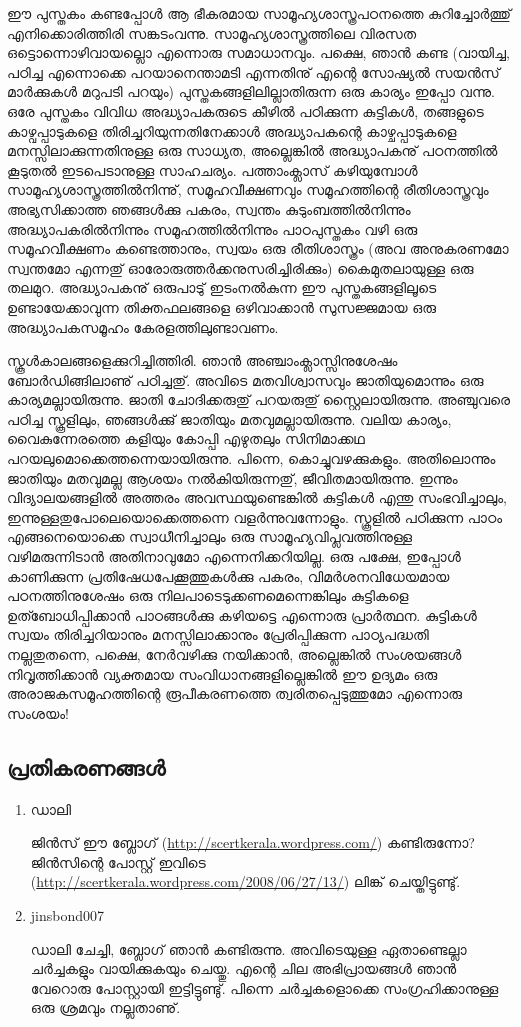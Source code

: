ഈ പുസ്തകം കണ്ടപ്പോള്‍ ആ ഭീകരമായ സാമൂഹ്യശാസ്ത്രപഠനത്തെ കുറിച്ചോര്‍ത്തു് എനിക്കൊരിത്തിരി സങ്കടംവന്നു. സാമൂഹ്യശാസ്ത്രത്തിലെ വിരസത ഒട്ടൊന്നൊഴിവായല്ലൊ എന്നൊരു സമാധാനവും. പക്ഷെ, ഞാന്‍ കണ്ട (വായിച്ച, പഠിച്ച എന്നൊക്കെ പറയാനെന്താമടി എന്നതിനു് എന്റെ സോഷ്യല്‍ സയന്‍സ് മാര്‍ക്കുകള്‍ മറുപടി പറയും) പുസ്തകങ്ങളിലില്ലാതിരുന്ന ഒരു കാര്യം ഇപ്പോ വന്നു. ഒരേ പുസ്തകം വിവിധ അദ്ധ്യാപകരുടെ കീഴില്‍ പഠിക്കുന്ന കുട്ടികള്‍, തങ്ങളുടെ കാഴ്വപ്പാടുകളെ തിരിച്ചറിയുന്നതിനേക്കാള്‍ അദ്ധ്യാപകന്റെ കാഴ്ചപ്പാടുകളെ മനസ്സിലാക്കുന്നതിനുള്ള ഒരു സാധ്യത, അല്ലെങ്കില്‍ അദ്ധ്യാപകനു് പഠനത്തില്‍ കൂടുതല്‍ ഇടപെടാനുള്ള സാഹചര്യം. പത്താംക്ലാസ് കഴിയുമ്പോള്‍ സാമൂഹ്യശാസ്ത്രത്തില്‍നിന്നു്, സമൂഹവീക്ഷണവും സമൂഹത്തിന്റെ രീതിശാസ്ത്രവും അഭ്യസിക്കാത്ത ഞങ്ങള്‍ക്കു പകരം, സ്വന്തം കുടുംബത്തില്‍നിന്നും അദ്ധ്യാപകരില്‍നിന്നും സമൂഹത്തില്‍നിന്നും പാഠപുസ്തകം വഴി ഒരു സമൂഹവീക്ഷണം കണ്ടെത്താനും, സ്വയം ഒരു രീതിശാസ്ത്രം (അവ അനുകരണമോ സ്വന്തമോ എന്നതു് 
ഓരോരുത്തര്‍ക്കനുസരിച്ചിരിക്കും) കൈമുതലായുള്ള ഒരു തലമുറ. അദ്ധ്യാപകനു് ഒരുപാടു് ഇടംനല്‍കുന്ന ഈ പുസ്തകങ്ങളിലൂടെ ഉണ്ടായേക്കാവുന്ന 
തിക്തഫലങ്ങളെ ഒഴിവാക്കാന്‍ സുസജ്ജമായ ഒരു അദ്ധ്യാപകസമൂഹം കേരളത്തിലുണ്ടാവണം.

സ്കൂള്‍കാലങ്ങളെക്കുറിച്ചിത്തിരി. ഞാന്‍ അഞ്ചാംക്ലാസ്സിനുശേഷം ബോര്‍ഡിങ്ങിലാണു് പഠിച്ചതു്. അവിടെ മതവിശ്വാസവും ജാതിയുമൊന്നും ഒരു കാര്യമല്ലായിരുന്നു. ജാതി ചോദിക്കരുതു് പറയരുതു് സ്റ്റൈലായിരുന്നു. അഞ്ചുവരെ പഠിച്ച സ്കൂളിലും, ഞങ്ങള്‍ക്കു് ജാതിയും മതവുമല്ലായിരുന്നു. വലിയ കാര്യം, വൈകുന്നേരത്തെ കളിയും കോപ്പി എഴുതലും സിനിമാക്കഥ പറയലുമൊക്കെത്തന്നെയായിരുന്നു. പിന്നെ, കൊച്ചുവഴക്കുകളും. അതിലൊന്നും ജാതിയും മതവുമല്ല ആശയം നല്‍കിയിരുന്നതു്, ജീവിതമായിരുന്നു. ഇന്നും വിദ്യാലയങ്ങളില്‍ അത്തരം അവസ്ഥയുണ്ടെങ്കില്‍ കുട്ടികള്‍ എന്തു സംഭവിച്ചാലും, ഇന്നുള്ളതുപോലെയൊക്കെത്തന്നെ വളര്‍ന്നുവന്നോളും. സ്കൂളില്‍ പഠിക്കുന്ന പാഠം എങ്ങനെയൊക്കെ സ്വാധീനിച്ചാലും ഒരു സാമൂഹ്യവിപ്ലവത്തിനുള്ള വഴിമരുന്നിടാന്‍ അതിനാവുമോ എന്നെനിക്കറിയില്ല. ഒരു പക്ഷേ, ഇപ്പോള്‍ കാണിക്കുന്ന 
പ്രതിഷേധപേക്കൂത്തുകള്‍ക്കു പകരം, വിമര്‍ശനവിധേയമായ പഠനത്തിനുശേഷം ഒരു നിലപാടെടുക്കണമെന്നെങ്കിലും കുട്ടികളെ ഉത്ബോധിപ്പിക്കാന്‍ പാഠങ്ങള്‍ക്കു കഴിയട്ടെ എന്നൊരു പ്രാര്‍ത്ഥന. കുട്ടികള്‍ സ്വയം തിരിച്ചറിയാനും മനസ്സിലാക്കാനും പ്രേരിപ്പിക്കുന്ന പാഠ്യപദ്ധതി നല്ലതുതന്നെ, പക്ഷെ, നേര്‍വഴിക്കു നയിക്കാന്‍, അല്ലെങ്കില്‍ സംശയങ്ങള്‍ നിവൃത്തിക്കാന്‍ വ്യക്തമായ സംവിധാനങ്ങളില്ലെങ്കില്‍ ഈ ഉദ്യമം ഒരു അരാജകസമൂഹത്തിന്റെ രൂപീകരണത്തെ ത്വരിതപ്പെടുത്തുമോ എന്നൊരു സംശയം!

\subsection*{പ്രതികരണങ്ങള്‍}

\begin{enumerate}
 \item{ഡാലി}

ജിന്‍സ് ഈ ബ്ലോഗ് (\url{http://scertkerala.wordpress.com/}) കണ്ടിരുന്നോ?  ജിന്‍സിന്റെ പോസ്റ്റ് 
ഇവിടെ (\url{http://scertkerala.wordpress.com/2008/06/27/13/}) ലിങ്ക് ചെയ്തിട്ടുണ്ടു്.
\item{jinsbond007}

ഡാലി ചേച്ചി, ബ്ലോഗ് ഞാന്‍ കണ്ടിരുന്നു. അവിടെയുള്ള ഏതാണ്ടെല്ലാ ചര്‍ച്ചകളും വായിക്കുകയും ചെയ്തു. 
എന്റെ ചില അഭിപ്രായങ്ങള്‍ ഞാന്‍ വേറൊരു പോസ്റ്റായി ഇട്ടിട്ടുണ്ടു്. പിന്നെ ചര്‍ച്ചകളൊക്കെ സംഗ്രഹിക്കാനുള്ള 
ഒരു ശ്രമവും നല്ലതാണു്.

\end{enumerate}

\newpage
